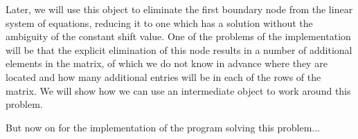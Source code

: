 \documentclass{article}
\begin{document}
Later, we will use this object to eliminate the first boundary node from the
linear system of equations, reducing it to one which has a solution without
the ambiguity of the constant shift value. One of the problems of the
implementation will be that the explicit elimination of this node results in a
number of additional elements in the matrix, of which we do not know in
advance where they are located and how many additional entries will be in each
of the rows of the matrix. We will show how we can use an intermediate object
to work around this problem.

But now on for the implementation of the program solving this problem...
\end{document}

